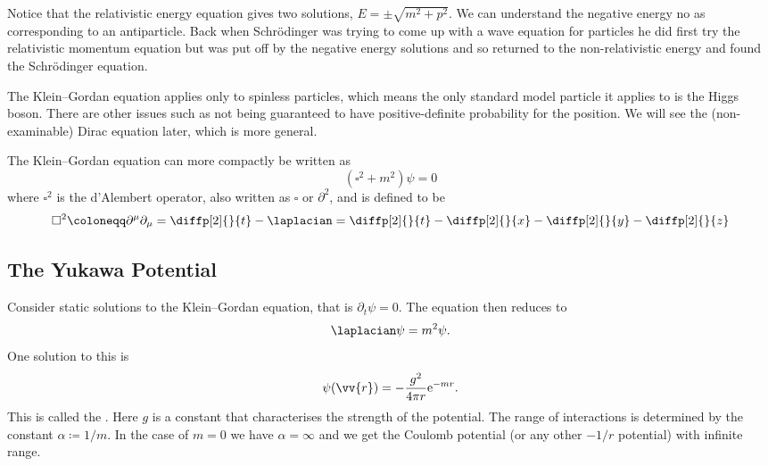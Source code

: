 \documentclass[fleqn]{NotesClass}
\newcommand*{\e}{\mathrm{e}}
\newcommand*{\dalembertian}{\square^2}
\begin{document}
    Notice that the relativistic energy equation gives two solutions, \(E = \pm \sqrt{m^2 + p^2}\).
    We can understand the negative energy no as corresponding to an antiparticle.
    Back when Schr\"odinger was trying to come up with a wave equation for particles he did first try the relativistic momentum equation but was put off by the negative energy solutions and so returned to the non-relativistic energy and found the Schr\"odinger equation.
    
    The Klein--Gordan equation applies only to spinless particles, which means the only standard model particle it applies to is the Higgs boson.
    There are other issues such as not being guaranteed to have positive-definite probability for the position.
    We will see the (non-examinable) Dirac equation later, which is more general.
    
    The Klein--Gordan equation can more compactly be written as
    \begin{equation}
        (\dalembertian + m^2)\psi = 0
    \end{equation}
    where \(\dalembertian\) is the d'Alembert operator, also written as \(\square\) or \(\partial^2\), and is defined to be
    \begin{equation}
        \dalembertian \coloneqq \partial^\mu\partial_\mu = \diffp[2]{}{t} - \laplacian = \diffp[2]{}{t} - \diffp[2]{}{x} - \diffp[2]{}{y} -\diffp[2]{}{z}
    \end{equation}
    
    \subsection{The Yukawa Potential}
    Consider static solutions to the Klein--Gordan equation, that is \(\partial_t\psi = 0\).
    The equation then reduces to
    \begin{equation}
        \laplacian \psi = m^2\psi.
    \end{equation}
    One solution to this is
    \begin{equation}
        \psi(\vv{r}) = -\frac{g^2}{4\pi r}\e^{-mr}.
    \end{equation}
    This is called the .
    Here \(g\) is a constant that characterises the strength of the potential.
    The range of interactions is determined by the constant \(\alpha \coloneqq 1/m\).
    In the case of \(m = 0\) we have \(\alpha = \infty\) and we get the Coulomb potential (or any other \(-1/r\) potential) with infinite range.
    
\end{document}

